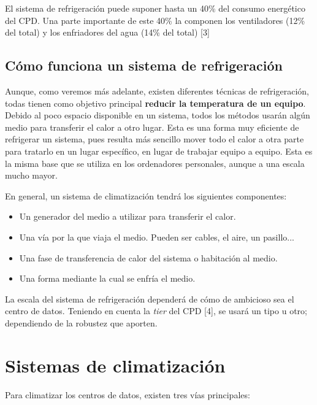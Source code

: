 El sistema de refrigeración puede suponer hasta un 40\% del consumo energético del CPD. Una parte importante de este 40\% la componen los ventiladores (12\% del total) y los enfriadores del agua (14\% del total) [3]

\subsection*{Cómo funciona un sistema de refrigeración}

Aunque, como veremos más adelante, existen diferentes técnicas de refrigeración, todas tienen como objetivo principal \textbf{reducir la temperatura de un equipo}. Debido al poco espacio disponible en un sistema, todos los métodos usarán algún medio para transferir el calor a otro lugar. Esta es una forma muy eficiente de refrigerar un sistema, pues resulta más sencillo mover todo el calor a otra parte para tratarlo en un lugar específico, en lugar de trabajar equipo a equipo. Esta es la misma base que se utiliza en los ordenadores personales, aunque a una escala mucho mayor.

En general, un sistema de climatización tendrá los siguientes componentes:

\begin{itemize}
    \item Un generador del medio a utilizar para transferir el calor.
    \item Una vía por la que viaja el medio. Pueden ser cables, el aire, un pasillo...
    \item Una fase de transferencia de calor del sistema o habitación al medio.
    \item Una forma mediante la cual se enfría el medio.
\end{itemize}

La escala del sistema de refrigeración dependerá de cómo de ambicioso sea el centro de datos. Teniendo en cuenta la \textit{tier} del CPD [4], se usará un tipo u otro; dependiendo de la robustez que aporten.


\section*{Sistemas de climatización}

Para climatizar los centros de datos, existen tres vías principales:

